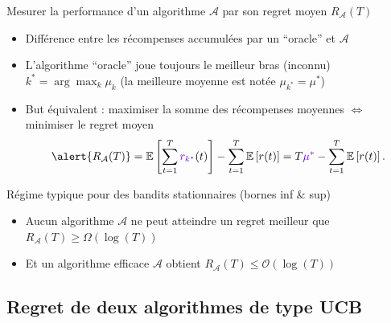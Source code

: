 \documentclass[11pt,french,ignorenonframetext,]{beamer}
\begin{document}
\begin{frame}{Mesurer la performance d'un algorithme $\mathcal{A}$ par son regret moyen $R_{\mathcal{A}}(T)$}

\begin{itemize}
  \item
  Différence entre les récompenses accumulées par un ``oracle'' et $\mathcal{A}$

  \item
  L'algorithme ``oracle'' joue toujours \textcolor{deeppurple}{le meilleur bras (inconnu) $k^* = \arg\max_k \mu_k$} (la meilleure moyenne est notée \textcolor{deeppurple}{$\mu_{k^*} = \mu^*$})

  \item
  But équivalent : maximiser la somme des récompenses moyennes
  $\Longleftrightarrow$ \alert{minimiser le regret moyen}
  \[ \alert{ R_{\mathcal{A}}(T) } = \mathbb{E}\left[ \sum\limits_{t=1}^T \textcolor{deeppurple}{r_{k^*}}(t) \right] - \sum\limits_{t=1}^T \mathbb{E}\left[ r(t) \right] = T \textcolor{deeppurple}{\mu^*} - \sum\limits_{t=1}^T \mathbb{E}\left[ r(t) \right]. \]

\end{itemize}

\pause
\vspace*{10pt}

\begin{exampleblock}{Régime typique pour des bandits stationnaires (bornes inf \& sup)}
  \begin{itemize}
  \item
  Aucun algorithme $\mathcal{A}$ ne peut atteindre un regret meilleur que
  \hfill{}
  $R_{\mathcal{A}}(T) \geq \Omega(\log(T))$

  \item
  Et un algorithme efficace $\mathcal{A}$ obtient
  \hfill{}
  $R_{\mathcal{A}}(T) \leq \mathcal{O}(\log(T))$
  \end{itemize}
\end{exampleblock}

\end{frame}

\subsection{\hfill{}Regret de deux algorithmes de type UCB\hfill{}}
\end{document}
